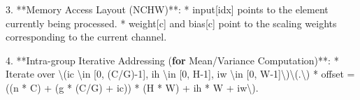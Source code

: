 \documentclass[
  10
]{article}
\newenvironment{Shaded}{}{}
\newcommand{\ControlFlowTok}[1]{\textcolor[rgb]{0.00,0.44,0.13}{\textbf{#1}}}
\newcommand{\DecValTok}[1]{\textcolor[rgb]{0.25,0.63,0.44}{#1}}
\newcommand{\FloatTok}[1]{\textcolor[rgb]{0.25,0.63,0.44}{#1}}
\newcommand{\NormalTok}[1]{#1}
\newcommand{\OperatorTok}[1]{\textcolor[rgb]{0.40,0.40,0.40}{#1}}
\begin{document}
\begin{Shaded}
\begin{Highlighting}[]
\FloatTok{3.} \OperatorTok{**}\NormalTok{Memory Access Layout }\OperatorTok{(}\NormalTok{NCHW}\OperatorTok{)**:}
    \OperatorTok{*}\NormalTok{ \textasciigrave{}input}\OperatorTok{[}\NormalTok{idx}\OperatorTok{]}\NormalTok{\textasciigrave{} points to the element currently being processed}\OperatorTok{.}
    \OperatorTok{*}\NormalTok{ \textasciigrave{}weight}\OperatorTok{[}\NormalTok{c}\OperatorTok{]}\NormalTok{\textasciigrave{} and \textasciigrave{}bias}\OperatorTok{[}\NormalTok{c}\OperatorTok{]}\NormalTok{\textasciigrave{} point to the scaling weights corresponding to the current channel}\OperatorTok{.}

\FloatTok{4.} \OperatorTok{**}\NormalTok{Intra}\OperatorTok{{-}}\NormalTok{group Iterative Addressing }\OperatorTok{(}\ControlFlowTok{for}\NormalTok{ Mean}\OperatorTok{/}\NormalTok{Variance Computation}\OperatorTok{)**:}
    \OperatorTok{*}\NormalTok{ Iterate over \textbackslash{}}\OperatorTok{(}\NormalTok{ic \textbackslash{}in }\OperatorTok{[}\DecValTok{0}\OperatorTok{,} \OperatorTok{(}\NormalTok{C}\OperatorTok{/}\NormalTok{G}\OperatorTok{){-}}\DecValTok{1}\OperatorTok{],}\NormalTok{ ih \textbackslash{}in }\OperatorTok{[}\DecValTok{0}\OperatorTok{,}\NormalTok{ H}\OperatorTok{{-}}\DecValTok{1}\OperatorTok{],}\NormalTok{ iw \textbackslash{}in }\OperatorTok{[}\DecValTok{0}\OperatorTok{,}\NormalTok{ W}\OperatorTok{{-}}\DecValTok{1}\OperatorTok{]}\NormalTok{\textbackslash{}}\OperatorTok{)}\NormalTok{\textbackslash{}}\OperatorTok{(.}\NormalTok{\textbackslash{}}\OperatorTok{)}
    \OperatorTok{*}\NormalTok{ \textasciigrave{}offset }\OperatorTok{=} \OperatorTok{((}\NormalTok{n }\OperatorTok{*}\NormalTok{ C}\OperatorTok{)} \OperatorTok{+} \OperatorTok{(}\NormalTok{g }\OperatorTok{*} \OperatorTok{(}\NormalTok{C}\OperatorTok{/}\NormalTok{G}\OperatorTok{)} \OperatorTok{+}\NormalTok{ ic}\OperatorTok{))} \OperatorTok{*} \OperatorTok{(}\NormalTok{H }\OperatorTok{*}\NormalTok{ W}\OperatorTok{)} \OperatorTok{+}\NormalTok{ ih }\OperatorTok{*}\NormalTok{ W }\OperatorTok{+}\NormalTok{ iw\textbackslash{}}\OperatorTok{).}


\end{Highlighting}
\end{Shaded}
\end{document}
